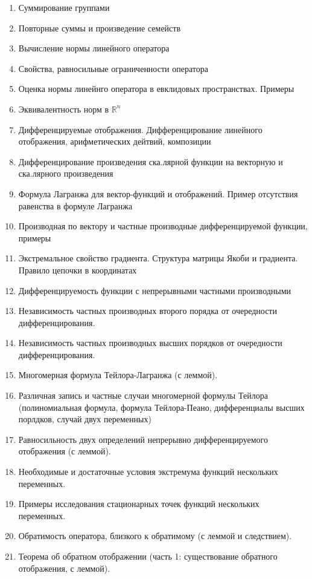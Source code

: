 \documentclass[12pt, a4paper]{article}
\begin{document}
\begin{enumerate}
    \item Суммирование группами
    \item Повторные суммы и произведение семейств
    \item Вычисление нормы линейного оператора
    \item Свойства, равносильные ограниченности оператора
    \item Оценка нормы линейнго оператора в евклидовых пространствах. Примеры
    \item Эквивалентность норм в $\mathbb{R}^{n}$
    \item Дифференцируемые отображения. Дифференцирование линейного отображения, арифметических дейтвий, композиции
    \item Дифференцирование произведения ска.лярной функции на векторную и ска.лярного произведения
    \item Формула Лагранжа для вектор-функций и отображений. Пример отсутствия равенства в формуле Лагранжа
    \item Производная по вектору и частные производные дифференцируемой функции, примеры
    \item Экстремальное свойство градиента. Структура матрицы Якоби и градиента. Правило цепочки в координатах
    \item Дифференцируемость функции с непрерывными частными производными
    \item Независимость частных производных второго порядка от очередности дифференцирования. 
    \item Независимость частных производных высших порядков от очередности дифференцирования.
    \item Многомерная формула Тейлора-Лагранжа (с леммой).
    \item Различная запись и частные случаи многомерной формулы Тейлора (полиномиальная формула, формула Тейлора-Пеано, дифференциалы высших порлдков, случай двух переменных)
    \item Равносильность двух определений непрерывно дифференцируемого отображения (с леммой).
    \item Необходимые и достаточные условия экстремума функций нескольких переменных.
    \item Примеры исследования стационарных точек функций нескольких переменных.
    \item Обратимость оператора, близкого к обратимому (с леммой и следствием).
    \item Теорема об обратном отображении (часть 1: существование обратного отображения, с леммой). 

\end{enumerate}
\end{document}
